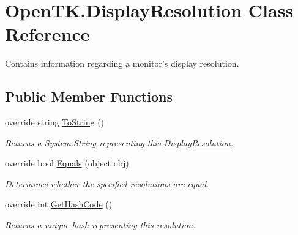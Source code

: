 \hypertarget{class_open_t_k_1_1_display_resolution}{\section{Open\-T\-K.\-Display\-Resolution Class Reference}
\label{class_open_t_k_1_1_display_resolution}
}


Contains information regarding a monitor's display resolution. 


\subsection*{Public Member Functions}
\begin{DoxyCompactItemize}
\item 
override string \hyperlink{class_open_t_k_1_1_display_resolution_a3d5a5df2af4538eda19a1a27bcfb55d4}{To\-String} ()
\begin{DoxyCompactList}\small\item\em Returns a System.\-String representing this \hyperlink{class_open_t_k_1_1_display_resolution}{Display\-Resolution}. \end{DoxyCompactList}\item 
override bool \hyperlink{class_open_t_k_1_1_display_resolution_ad791a6f6a590edffd568c489d4ec088a}{Equals} (object obj)
\begin{DoxyCompactList}\small\item\em Determines whether the specified resolutions are equal.\end{DoxyCompactList}\item 
override int \hyperlink{class_open_t_k_1_1_display_resolution_a03f663bb26b1a67265036ce8f563d9f7}{Get\-Hash\-Code} ()
\begin{DoxyCompactList}\small\item\em Returns a unique hash representing this resolution.\end{DoxyCompactList}\end{DoxyCompactItemize}
